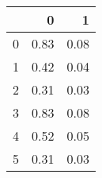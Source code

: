 \begin{tabular}{lrr}
\toprule
{} &     0 &     1 \\
\midrule
0 &  0.83 &  0.08 \\
1 &  0.42 &  0.04 \\
2 &  0.31 &  0.03 \\
3 &  0.83 &  0.08 \\
4 &  0.52 &  0.05 \\
5 &  0.31 &  0.03 \\
\bottomrule
\end{tabular}
